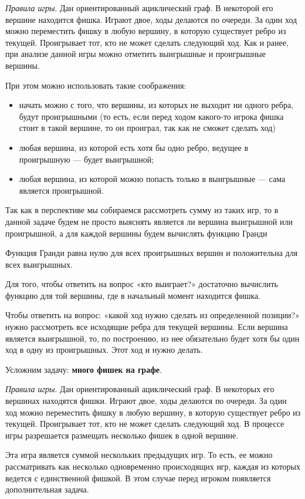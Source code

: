 \documentclass[12pt, letterpaper, titlepage]{article}
\begin{document}
\emph{Правила игры}. Дан ориентированный ациклический граф. В некоторой его вершине находится фишка. Играют двое, ходы делаются по очереди. За один ход можно переместить фишку в любую вершину, в которую существует ребро из текущей. Проигрывает тот, кто не может сделать следующий ход.
Как и ранее, при анализе данной игры можно отметить выигрышные и проигрышные вершины.

При этом можно использовать такие соображения:
\begin{itemize}
    \item начать можно с того, что вершины, из которых не выходит ни одного ребра, будут проигрышными (то есть, если перед ходом какого-то игрока фишка стоит в такой вершине, то он проиграл, так как не сможет сделать ход)
    \item любая вершина, из которой есть хотя бы одно ребро, ведущее в проигрышную — будет выигрышной;
    \item любая вершина, из которой можно попасть только в выигрышные — сама является проигрышной.
\end{itemize}

Так как в перспективе мы собираемся рассмотреть сумму из таких игр, то в данной задаче будем не просто выяснять является ли вершина выигрышной или проигрышной, а для каждой вершины будем вычислять функцию Гранди

Функция Гранди равна нулю для всех проигрышных вершин и положительна для всех выигрышных.

Для того, чтобы ответить на вопрос «кто выиграет?» достаточно вычислить функцию для той вершины, где в начальный момент находится фишка.

Чтобы ответить на вопрос: «какой ход нужно сделать из определенной позиции?» нужно рассмотреть все исходящие ребра для текущей вершины. Если вершина является выигрышной, то, по построению, из нее обязательно будет хотя бы один ход в одну из проигрышных. Этот ход и нужно делать.

Усложним задачу: \textbf{много фишек на графе}.

\emph{Правила игры}. Дан ориентированный ациклический граф. В некоторых его вершинах находятся фишки. Играют двое, ходы делаются по очереди. За один ход можно переместить фишку в любую вершину, в которую существует ребро из текущей. Проигрывает тот, кто не может сделать следующий ход. В процессе игры разрешается размещать несколько фишек в одной вершине.

Эта игра является суммой нескольких предыдущих игр.
То есть, ее можно рассматривать как несколько одновременно происходящих игр, каждая из которых ведется с единственной фишкой. В этом случае перед игроком появляется дополнительная задача.
\end{document}
